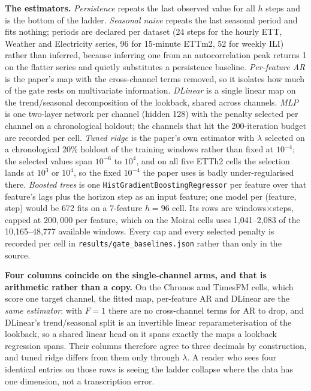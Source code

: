 \textbf{The estimators.}  \emph{Persistence} repeats the last observed value for
all $h$ steps and is the bottom of the ladder.  \emph{Seasonal naive} repeats the
last seasonal period
and fits nothing; periods are declared per dataset (24 steps for the hourly ETT,
Weather and Electricity series, 96 for 15-minute ETTm2, 52 for weekly ILI) rather
than inferred, because inferring one from an autocorrelation peak returns 1 on
the flatter series and quietly substitutes a persistence baseline.
\emph{Per-feature AR} is the paper's map with the cross-channel terms removed, so
it isolates how much of the gate rests on multivariate information.
\emph{DLinear} is a single linear map on the trend/seasonal decomposition of the
lookback, shared across channels.  \emph{MLP} is one two-layer network per channel
(hidden 128) with the penalty selected per channel on a chronological holdout;
the channels that hit the 200-iteration budget are recorded per cell.  \emph{Tuned
ridge} is the paper's own estimator with $\lambda$ selected on a chronological
20\% holdout of the training windows rather than fixed at $10^{-4}$; the selected
values span $10^{-6}$ to $10^{4}$, and on all five ETTh2 cells the selection lands
at $10^{3}$ or $10^{4}$, so the fixed $10^{-4}$ the paper uses is badly
under-regularised there.  \emph{Boosted trees} is one
\texttt{HistGradientBoostingRegressor} per feature over that feature's lags plus
the horizon step as an input feature; one model per (feature, step) would be 672
fits on a 7-feature $h{=}96$ cell.  Its rows are windows${\times}$steps, capped at
$200{,}000$ per feature, which on the Moirai cells uses 1{,}041--2{,}083 of the
10{,}165--48{,}777 available windows.  Every cap and every selected penalty is
recorded per cell in \texttt{results/gate\_baselines.json} rather than only in the
source.

\textbf{Four columns coincide on the single-channel arms, and that is arithmetic
rather than a copy.}  On the Chronos and TimesFM cells, which score one target
channel, the fitted map, per-feature AR and DLinear are the \emph{same estimator}:
with $F{=}1$ there are no cross-channel terms for AR to drop, and DLinear's
trend/seasonal split is an invertible linear reparameterisation of the lookback, so
a shared linear head on it spans exactly the maps a lookback regression spans.
Their columns therefore agree to three decimals by construction, and tuned ridge
differs from them only through $\lambda$.  A reader who sees four identical entries
on those rows is seeing the ladder collapse where the data has one dimension, not
a transcription error.

